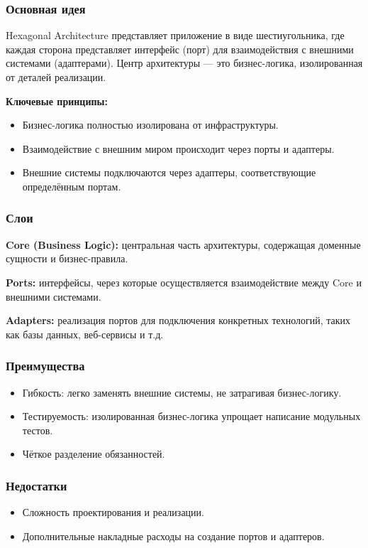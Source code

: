 \subsubsection{Основная идея}
Hexagonal Architecture представляет приложение в виде шестиугольника, где каждая сторона представляет интерфейс (порт) для взаимодействия с внешними системами (адаптерами). Центр архитектуры — это бизнес-логика, изолированная от деталей реализации.

\textbf{Ключевые принципы:}
\begin{itemize}
    \item Бизнес-логика полностью изолирована от инфраструктуры.
    \item Взаимодействие с внешним миром происходит через порты и адаптеры.
    \item Внешние системы подключаются через адаптеры, соответствующие определённым портам.
\end{itemize}

\subsubsection{Слои}
\textbf{Core (Business Logic):} центральная часть архитектуры, содержащая доменные сущности и бизнес-правила.

\textbf{Ports:} интерфейсы, через которые осуществляется взаимодействие между Core и внешними системами.

\textbf{Adapters:} реализация портов для подключения конкретных технологий, таких как базы данных, веб-сервисы и т.д.

\subsubsection{Преимущества}
\begin{itemize}
    \item Гибкость: легко заменять внешние системы, не затрагивая бизнес-логику.
    \item Тестируемость: изолированная бизнес-логика упрощает написание модульных тестов.
    \item Чёткое разделение обязанностей.
\end{itemize}

\subsubsection{Недостатки}
\begin{itemize}
    \item Сложность проектирования и реализации.
    \item Дополнительные накладные расходы на создание портов и адаптеров.
\end{itemize}


